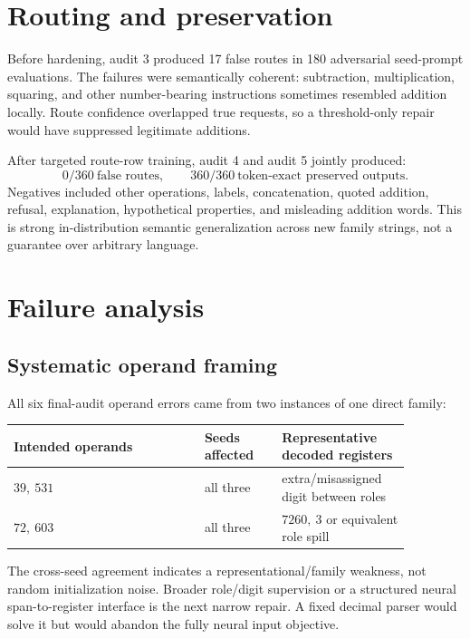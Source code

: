 \documentclass[11pt]{article}
\begin{document}
\section{Routing and preservation}

Before hardening, audit 3 produced 17 false routes in 180 adversarial
seed-prompt evaluations. The failures were semantically coherent: subtraction,
multiplication, squaring, and other number-bearing instructions sometimes
resembled addition locally. Route confidence overlapped true requests, so a
threshold-only repair would have suppressed legitimate additions.

After targeted route-row training, audit 4 and audit 5 jointly produced:
\[
  0/360\ \text{false routes}, \qquad
  360/360\ \text{token-exact preserved outputs}.
\]
Negatives included other operations, labels, concatenation, quoted addition,
refusal, explanation, hypothetical properties, and misleading addition words.
This is strong in-distribution semantic generalization across new family
strings, not a guarantee over arbitrary language.

\section{Failure analysis}

\subsection{Systematic operand framing}

All six final-audit operand errors came from two instances of one direct family:

\begin{center}
\small
\begin{tabular}{p{0.42\linewidth}p{0.17\linewidth}p{0.28\linewidth}}
\toprule
Intended operands & Seeds affected & Representative decoded registers\\
\midrule
$39,\ 531$ & all three & extra/misassigned digit between roles\\
$72,\ 603$ & all three & $7260,\ 3$ or equivalent role spill\\
\bottomrule
\end{tabular}
\end{center}

The cross-seed agreement indicates a representational/family weakness, not
random initialization noise. Broader role/digit supervision or a structured
neural span-to-register interface is the next narrow repair. A fixed decimal
parser would solve it but would abandon the fully neural input objective.
\end{document}
